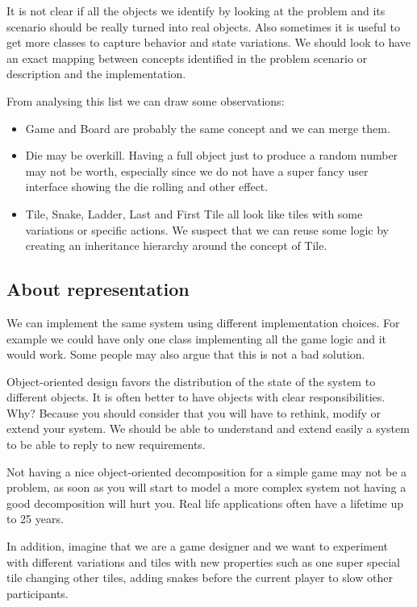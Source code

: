 \documentclass[10pt,twoside,english]{_support/latex/sbabook/sbabook}
\begin{document}
It is not clear if all the objects we identify by looking at the problem and its scenario should be really turned into real objects. Also sometimes it is useful to get more classes to capture behavior and state variations. We should look to have an exact mapping between concepts identified in the problem scenario or description and the implementation. 

From analysing this list we can draw some observations: 

\begin{itemize}
\item Game and Board are probably the same concept and we can merge them.
\item Die may be overkill. Having a full object just to produce a random number may not be worth, especially since we do not have a super fancy user interface showing the die rolling and other effect. 
\item Tile, Snake, Ladder, Last and First Tile all look like tiles with some variations or specific actions. We suspect that we can reuse some logic by creating an inheritance hierarchy around the concept of Tile. 
\end{itemize}
\subsection{About representation }
We can implement the same system using different implementation choices. For example we could have only one class implementing all the game logic and it would work. Some people may also 
argue that this is not a bad solution.

Object-oriented design favors the distribution of the state of the system to different objects.
It is often better to have objects with clear responsibilities. Why? Because you should consider that you will have to rethink, modify or extend your system. We should be able to understand and extend easily a system to be able to reply to new requirements.

Not having a nice object-oriented decomposition for a simple game may not be a problem, as soon as you will start to  model a more complex system not having a good decomposition will hurt you. Real life applications often have a lifetime up to 25 years. 

In addition, imagine that we are a game designer and we want to experiment with different variations and tiles with new properties such as one super special tile changing other tiles, adding snakes before the current player to slow other participants.
\end{document}
